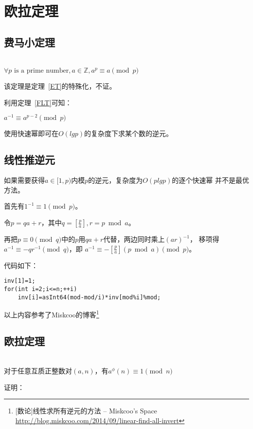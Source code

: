 \section{欧拉定理}
\subsection{费马小定理}\label{FLTS}
\begin{theorem}\label{FLT}
	~\\
	$\forall p \textrm{ is a prime number},a\in \mathbb{Z},a^p \equiv a \pmod{p}$
\end{theorem}

该定理是定理~\ref{ET}的特殊化，不证。

利用定理~\ref{FLT}可知：

\begin{inference}
	$a^{-1} \equiv a^{p-2} \pmod{p}$
\end{inference}

使用快速幂即可在$O(lgp)$的复杂度下求某个数的逆元。

\subsection{线性推逆元}

如果需要获得$a\in [1,p)$内模$p$的逆元，复杂度为$O(plgp)$的逐个快速幂
并不是最优方法。

首先有$1^{-1}\equiv 1 \pmod{p}$。

令$p=qa+r$，其中$q=[\frac{p}{a}],r=p \bmod a$。

再把$p \equiv 0 \pmod{q}$中的$p$用$qa+r$代替，两边同时乘上$(ar)^{-1}$，
移项得$a^{-1}\equiv -qr^{-1} \pmod{q}$，即
$a^{-1}\equiv -[\frac{p}{a}](p \bmod a) \pmod{p}$。

代码如下：
\begin{lstlisting}[title=inv]
inv[1]=1;
for(int i=2;i<=n;++i)
    inv[i]=asInt64(mod-mod/i)*inv[mod%i]%mod;
\end{lstlisting}

以上内容参考了Miskcoo的博客\footnote{[数论]线性求所有逆元的方法 – Miskcoo's Space
	\url{http://blog.miskcoo.com/2014/09/linear-find-all-invert}}

\subsection{欧拉定理}
\begin{theorem}\label{ET}
	~\\
	对于任意互质正整数对$(a,n)$，有$a^\phi(n) \equiv 1 \pmod{n}$
\end{theorem}
证明：


